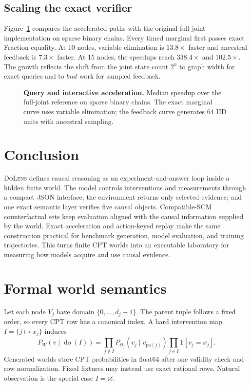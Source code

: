 \documentclass{article}
\newcommand{\method}{\textsc{DoLens}}
\newcommand{\doop}{\operatorname{do}}
\begin{document}
\subsection{Scaling the exact verifier}

Figure~\ref{fig:speedup} compares the accelerated paths with the original
full-joint implementation on sparse binary chains. Every timed marginal first
passes exact Fraction equality. At 10 nodes, variable elimination is $13.8\times$
faster and ancestral feedback is $7.3\times$ faster. At 15 nodes, the speedups
reach $338.4\times$ and $102.5\times$. The growth reflects the shift from the
joint state count $2^n$ to graph width for exact queries and to $bnd$ work for
sampled feedback.

\begin{figure}[H]
  \centering
  
  \caption{\textbf{Query and interactive acceleration.} Median speedup over the
  full-joint reference on sparse binary chains. The exact marginal curve uses
  variable elimination; the feedback curve generates 64 IID units with ancestral
  sampling.}
  \label{fig:speedup}
\end{figure}

\section{Conclusion}

\method{} defines causal reasoning as an experiment-and-answer loop inside a
hidden finite world. The model controls interventions and measurements through a
compact JSON interface; the environment returns only selected evidence; and one
exact semantic layer verifies five causal objects. Compatible-SCM counterfactual
sets keep evaluation aligned with the causal information supplied by the world.
Exact acceleration and action-keyed replay make the same construction practical
for benchmark generation, model evaluation, and training trajectories. This
turns finite CPT worlds into an executable laboratory for measuring how models
acquire and use causal evidence.




\newpage
\appendix

\section{Formal world semantics}

Let each node $V_j$ have domain $\{0,\ldots,d_j-1\}$. The parent tuple follows a
fixed order, so every CPT row has a canonical index. A hard intervention map
$I=\{j\mapsto x_j\}$ induces
\begin{equation}
P_W(v\mid\doop(I))=
\prod_{j\notin I}P_{\Theta_j}(v_j\mid v_{\mathrm{pa}(j)})
\prod_{j\in I}\mathbf{1}[v_j=x_j].
\end{equation}
Generated worlds store CPT probabilities in float64 after one validity check and
row normalization. Fixed fixtures may instead use exact rational rows. Natural
observation is the special case $I=\varnothing$.
\end{document}
